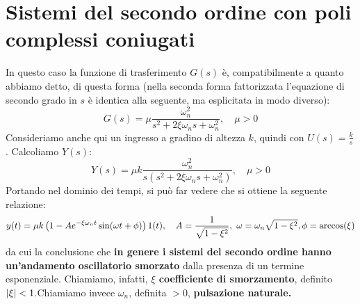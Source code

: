\section{Sistemi del secondo ordine con poli complessi coniugati}
In questo caso la funzione di trasferimento $G(s)$ è, compatibilmente a quanto abbiamo detto, di questa forma (nella seconda forma fattorizzata l'equazione di secondo grado in $s$ è identica alla seguente, ma esplicitata in modo diverso):
\begin{equation}
G(s) = \mu \frac{\omega_n^2}{s^2+2\xi\omega_n s + \omega_n^2}, \quad \mu > 0 
\end{equation}
Consideriamo anche qui un ingresso a gradino di altezza $k$, quindi con $U(s) = \frac{k}{s}$. Calcoliamo $Y(s)$:
\begin{equation*}
Y(s) = \mu k \frac{\omega_n^2}{s(s^2+2\xi\omega_n s + \omega_n^2)}, \quad \mu > 0 
\end{equation*}
Portando nel dominio dei tempi, si può far vedere che si ottiene la seguente relazione:
\begin{equation}
y(t) = \mu k \left( 1-Ae^{-\xi \omega_n t}\sin(\omega t + \phi) \right)1(t), \quad A = \frac{1}{\sqrt{1-\xi^2}}, \ \omega = \omega_n\sqrt{1-\xi^2}, \phi = \arccos(\xi) 
\end{equation}
 da cui la conclusione che \textbf{in genere i sistemi del secondo ordine hanno un'andamento oscillatorio smorzato} dalla presenza di un termine esponenziale. Chiamiamo, infatti, \textbf{$\xi$ coefficiente di smorzamento}, definito $\abs{\xi} < 1$.Chiamiamo invece $\omega_n$, definita $> 0$, \textbf{pulsazione naturale.}

